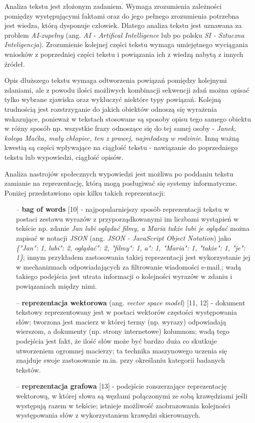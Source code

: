 Analiza tekstu jest złożonym zadaniem. Wymaga zrozumienia zależności pomiędzy występującymi faktami oraz do jego pełnego zrozumienia potrzebna jest wiedza, którą dysponuje człowiek. Dlatego analiza tekstu jest uznawana za problem \textit{AI-zupełny} (ang. \textit{AI - Artifical Intelligence} lub po polsku \textit{SI - Sztuczna Inteligencja}). Zrozumienie kolejnej części tekstu wymaga umiejętnego wyciągania wniosków z poprzedniej części tekstu i powiązania ich z wiedzą nabytą z innych źródeł. 

Opis dłuższego tekstu wymaga odtworzenia powiązań pomiędzy kolejnymi zdaniami, ale z powodu ilości możliwych kombinacji sekwencji zdań można opisać tylko wybrane zjawiska oraz wykluczyć niektóre typy powiązań. Kolejną trudnością jest rozstrzyganie do jakich obiektów odnoszą się wyrażenia wskazujące, ponieważ w tekstach stosowane są sposoby opisu tego samego obiektu w różny sposób np. wszystkie frazy odnoszące się do tej samej osoby - \textit{Janek, kolega Maćka, mały chłopiec, ten z prawej, najmłodszy w rodzinie}. Inną ważną kwestią są części wpływające na ciągłość tekstu - nawiązanie do poprzedniego tekstu lub wypowiedzi, ciągłość opisów.

Analiza nastrojów społecznych wypowiedzi jest możliwa po poddaniu tekstu zamianie na reprezentację, którą mogą posługiwać się systemy informatyczne. Poniżej przedstawiono opis kilku takich reprezentacji:
\begin{itemize}
	\item[--] \textbf{bag of words} [10] - najpopularniejszy sposób reprezentacji tekstu w postaci zestawu wyrazów z przyporządkowanymi im liczbami wystąpień w tekście np. zdanie \textit{Jan lubi oglądać filmy, a Maria także lubi je oglądać} można zapisać w notacji \textit{JSON} (ang. \textit{JSON - JavaScript Object Notation}) jako \textit{\{"Jan": 1, \textquotesingle \textquotesingle lubi": 2, \textquotesingle \textquotesingle oglądać": 2, "filmy": 1, \textquotesingle \textquotesingle a": 1, "Maria": 1, "także": 1, "je": 1\}}; innym przykładem zastosowania takiej reprezentacji jest wykorzystanie jej w mechanizmach odpowiadających za filtrowanie wiadomości e-mail.; wadą takiego podejścia jest utrata informacji o kolejności wyrazów w zdaniu i powiązaniach między nimi.
	\item[--] \textbf{reprezentacja wektorowa} (ang. \textit{vector space model}) [11, 12] - dokument tekstowy reprezentowany jest w postaci wektorów częstości występowania słów; tworzona jest macierz w której termy (np. wyrazy) odpowiadają wierszom, a dokumenty (np. strony internetowe) kolumnom; wadą tego podejścia jest fakt, że ilość słów może być bardzo duża co skutkuje utworzeniem ogromnej macierzy; ta technika maszynowego uczenia się znajduje swoje zastosowanie m.in. przy określaniu kategorii badanych tekstów.
	\item[--] \textbf{reprezentacja grafowa} [13] - podejście rozszerzające reprezentację wektorową, w której słowa są węzłami połączonymi ze sobą krawędziami jeśli występują razem w tekście; istnieje możliwość zaobrazowania kolejności występowania słów z wykorzystaniem krawędzi skierowanych.
\end{itemize}

